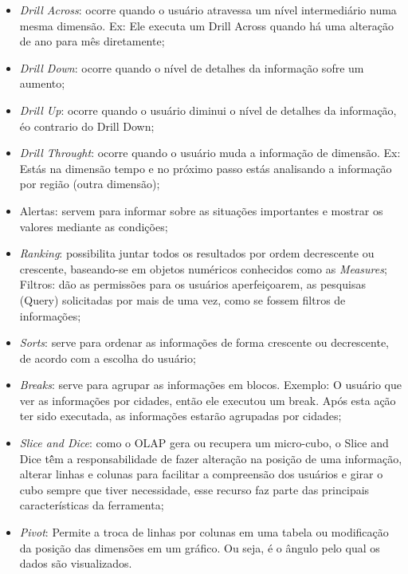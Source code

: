 \begin{itemize}

    \item \textit{Drill Across}: ocorre quando o usu\'{a}rio atravessa um n\'{i}vel intermedi\'{a}rio numa mesma dimens\~{a}o. Ex: Ele executa um Drill Across quando h\'{a} uma altera\c{c}\~{a}o de ano para mês diretamente;

    \item \textit{Drill Down}: ocorre quando o n\'{i}vel de detalhes da informa\c{c}\~{a}o sofre um aumento;
    
    \item \textit{Drill Up}: ocorre quando o usu\'{a}rio diminui o n\'{i}vel de detalhes da informa\c{c}\~{a}o, \'{e}o contrario do Drill Down;
    
    \item \textit{Drill Throught}: ocorre quando o usu\'{a}rio muda a informa\c{c}\~{a}o de dimens\~{a}o. Ex: Est\'{a}s na dimens\~{a}o tempo e no pr\'{o}ximo passo est\'{a}s analisando a informa\c{c}\~{a}o por regi\~{a}o (outra dimens\~{a}o);
    
    \item Alertas: servem para informar sobre as situa\c{c}\~{o}es importantes e mostrar os valores mediante as condi\c{c}\~{o}es;
    
    \item \textit{Ranking}: possibilita juntar todos os resultados por ordem decrescente ou crescente, baseando-se em objetos num\'{e}ricos conhecidos como as \textit{Measures}; Filtros: d\~{a}o as permiss\~{o}es para os usu\'{a}rios aperfei\c{c}oarem, as pesquisas (Query) solicitadas por mais de uma vez, como se fossem filtros de informa\c{c}\~{o}es;
    
    \item \textit{Sorts}: serve para ordenar as informa\c{c}\~{o}es de forma crescente ou decrescente, de acordo com a escolha do usu\'{a}rio;
    
    \item \textit{Breaks}: serve para agrupar as informa\c{c}\~{o}es em blocos. Exemplo: O usu\'{a}rio que ver as informa\c{c}\~{o}es por cidades, ent\~{a}o ele executou um break. Ap\'{o}s esta a\c{c}\~{a}o ter sido executada, as informa\c{c}\~{o}es estar\~{a}o agrupadas por cidades;
    
    \item \textit{Slice and Dice}: como o OLAP gera ou recupera um micro-cubo, o Slice and Dice t\^{e}̂m a responsabilidade de fazer altera\c{c}\~{a}o na posi\c{c}\~{a}o de uma informa\c{c}\~{a}o, alterar linhas e colunas para facilitar a compreens\~{a}o dos usu\'{a}rios e girar o cubo sempre que tiver necessidade, esse recurso faz parte das principais caracter\'{i}sticas da ferramenta;
    
    \item \textit{Pivot}: Permite a troca de linhas por colunas em uma tabela ou modifica\c{c}\~{a}o da posi\c{c}\~{a}o das dimens\~{o}es em um gr\'{a}fico. Ou seja, \'{e} o ângulo pelo qual os dados s\~{a}o visualizados.
    
\end{itemize}

